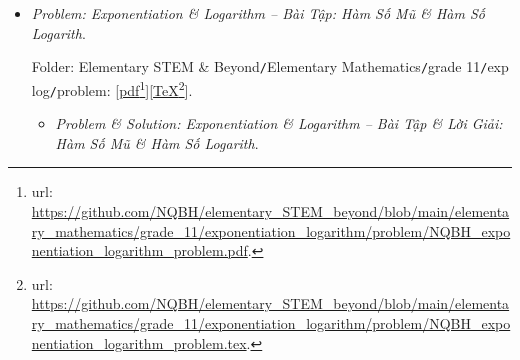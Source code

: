 \documentclass[12pt]{article}
\begin{document}
\begin{itemize}
	Folder: {\sf Elementary STEM \& Beyond{\tt/}Elementary Mathematics{\tt/}grade 11{\tt/}probability \& statistics{\tt/}problem}: [\href{https://github.com/NQBH/elementary_STEM_beyond/blob/main/elementary_mathematics/grade_11/probability_statistics/problem/NQBH_probability_statistics_problem.pdf}{pdf}\footnote{{\sc url}: \url{https://github.com/NQBH/elementary_STEM_beyond/blob/main/elementary_mathematics/grade_11/probability_statistics/problem/NQBH_probability_statistics_problem.pdf}.}][\href{https://github.com/NQBH/elementary_STEM_beyond/blob/main/elementary_mathematics/grade_11/probability_statistics/problem/NQBH_probability_statistics_problem.tex}{\TeX}\footnote{{\sc url}: \url{https://github.com/NQBH/elementary_STEM_beyond/blob/main/elementary_mathematics/grade_11/probability_statistics/problem/NQBH_probability_statistics_problem.tex}.}].
	\begin{itemize}
		\item {\it Problem \& Solution: Probability \& Statistics -- Bài Tập \& Lời Giải: Xác Suất \& Thống Kê}.
		
		Folder: {\sf Elementary STEM \& Beyond{\tt/}Elementary Mathematics{\tt/}grade 11{\tt/}probability \& statistics{\tt/}solution}: [\href{https://github.com/NQBH/elementary_STEM_beyond/blob/main/elementary_mathematics/grade_11/probability_statistics/solution/NQBH_probability_statistics_solution.pdf}{pdf}\footnote{{\sc url}: \url{https://github.com/NQBH/elementary_STEM_beyond/blob/main/elementary_mathematics/grade_11/probability_statistics/solution/NQBH_probability_statistics_solution.pdf}.}][\href{https://github.com/NQBH/elementary_STEM_beyond/blob/main/elementary_mathematics/grade_11/probability_statistics/solution/NQBH_probability_statistics_solution.tex}{\TeX}\footnote{{\sc url}: \url{https://github.com/NQBH/elementary_STEM_beyond/blob/main/elementary_mathematics/grade_11/probability_statistics/solution/NQBH_probability_statistics_solution.tex}.}].
	\end{itemize}	
	\item {\it Problem: Exponentiation \& Logarithm -- Bài Tập: Hàm Số Mũ \& Hàm Số Logarith}.
	
	Folder: {\sf Elementary STEM \& Beyond{\tt/}Elementary Mathematics{\tt/}grade 11{\tt/}exp log{\tt/}problem}: [\href{https://github.com/NQBH/elementary_STEM_beyond/blob/main/elementary_mathematics/grade_11/exponentiation_logarithm/problem/NQBH_exponentiation_logarithm_problem.pdf}{pdf}\footnote{{\sc url}: \url{https://github.com/NQBH/elementary_STEM_beyond/blob/main/elementary_mathematics/grade_11/exponentiation_logarithm/problem/NQBH_exponentiation_logarithm_problem.pdf}.}][\href{https://github.com/NQBH/elementary_STEM_beyond/blob/main/elementary_mathematics/grade_11/exponentiation_logarithm/problem/NQBH_exponentiation_logarithm_problem.tex}{\TeX}\footnote{{\sc url}: \url{https://github.com/NQBH/elementary_STEM_beyond/blob/main/elementary_mathematics/grade_11/exponentiation_logarithm/problem/NQBH_exponentiation_logarithm_problem.tex}.}].
	\begin{itemize}
		\item {\it Problem \& Solution: Exponentiation \& Logarithm -- Bài Tập \& Lời Giải: Hàm Số Mũ \& Hàm Số Logarith}.
		

\end{itemize}
\end{itemize}
\end{document}
